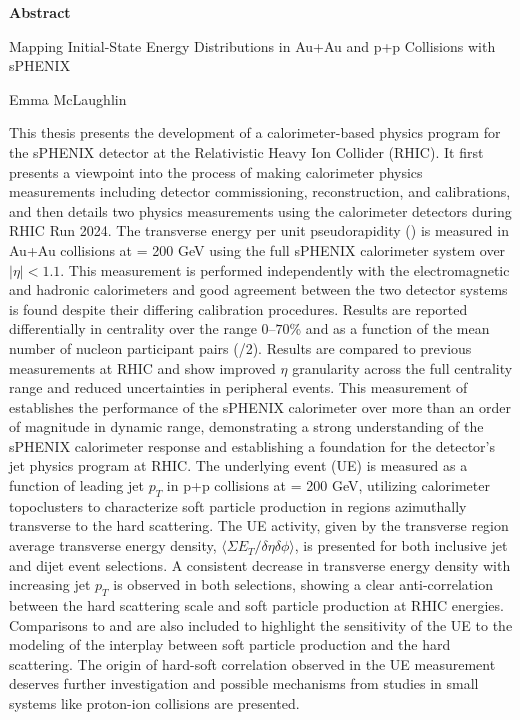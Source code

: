 
\begin{titlepage}
\begin{center}

\vspace*{5\baselineskip}
\textbf{\large Abstract}

Mapping Initial-State Energy Distributions in Au+Au and p+p Collisions with sPHENIX

Emma McLaughlin
\end{center}
\begin{flushleft}
\hspace{10mm}This thesis presents the development of a calorimeter-based physics program for the sPHENIX detector at the Relativistic Heavy Ion Collider (RHIC). It first presents a viewpoint into the process of making calorimeter physics measurements including detector commissioning, reconstruction, and calibrations, and then details two physics measurements using the calorimeter detectors during RHIC Run 2024.
The transverse energy per unit pseudorapidity (\detdeta) is measured in Au+Au collisions at \snn = 200 GeV using the full sPHENIX calorimeter system over $|\eta| < 1.1$. This measurement is performed independently with the electromagnetic and hadronic calorimeters and good agreement between the two detector systems is found despite their differing calibration procedures. Results are reported differentially in centrality over the range $0$--$70$\% and as a function of the mean number of nucleon participant pairs (\Npart/2). Results are compared to previous measurements at RHIC and show improved $\eta$ granularity across the full centrality range and reduced uncertainties in peripheral events. This measurement of \detdeta establishes the performance of the sPHENIX calorimeter over more than an order of magnitude in dynamic range, demonstrating a strong understanding of the sPHENIX calorimeter response and establishing a foundation for the detector's jet physics program at RHIC.
The underlying event (UE) is measured as a function of leading jet $p_{T}$ in p+p collisions at \sqs = 200 GeV, utilizing calorimeter topoclusters to characterize soft particle production in regions azimuthally transverse to the hard scattering. The UE activity, given by the transverse region average transverse energy density, $\langle \Sigma E_T / \delta\eta\delta\phi \rangle$, is presented for both inclusive jet and dijet event selections. A consistent decrease in transverse energy density with increasing jet $p_{T}$ is observed in both selections, showing a clear anti-correlation between the hard scattering scale and soft particle production at RHIC energies. Comparisons to \pythia and \herwig are also included to highlight the sensitivity of the UE to the modeling of the interplay between soft particle production and the hard scattering. The origin of hard-soft correlation observed in the UE measurement deserves further investigation and possible mechanisms from studies in small systems like proton-ion collisions are presented. 

\end{flushleft}
\vspace*{\fill}
\end{titlepage}
